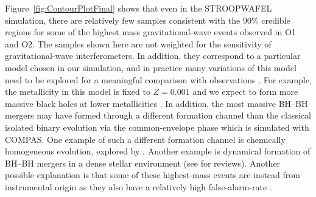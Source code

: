 \documentclass[a4paper,fleqn,usenatbib,useAMS,usedcolumn]{mnras}
\newcommand{\AISs}{\textsc{STROOPWAFEL}}
\begin{document}
Figure~\ref{fig:ContourPlotFinal} shows that even in the \AISs{} simulation, there are relatively few samples consistent with the 90$\%$ credible regions for some of the highest mass gravitational-wave events  observed in O1 and O2.  The samples shown here are not weighted for the sensitivity of gravitational-wave interferometers. In addition, they correspond to a particular model chosen in our simulation, and in practice many variations of this model need to be explored  for a meaningful comparison with observations \citep[e.g.,][]{2018MNRAS.477.4685B}. For example, the metallicity in this model is fixed to $Z = 0.001$ and we expect to form more massive black holes at lower metallicities \citep[e.g.,][]{2015MNRAS.451.4086S,2016Natur.534..512B, 2019arXiv190608136N}. In addition, the most massive BH--BH mergers may have formed through a different formation channel than the classical isolated binary evolution via the common-envelope phase which is simulated with \textsc{COMPAS}. One example of such a different formation channel is chemically homogeneous evolution, explored by  \citet[][]{10.1093/mnras/stw379, 2016MNRAS.460.3545D, 2016A&A...588A..50M}. Another example  is dynamical formation of BH--BH mergers in a dense stellar environment (see \citealt{2018arXiv180605820M,2018arXiv180909130M} for reviews). Another possible explanation is that some of these highest-mass events are instead from instrumental origin as they also have a relatively high false-alarm-rate \citep{2018arXiv181112907T, 2019arXiv190210331Z}.
\end{document}
